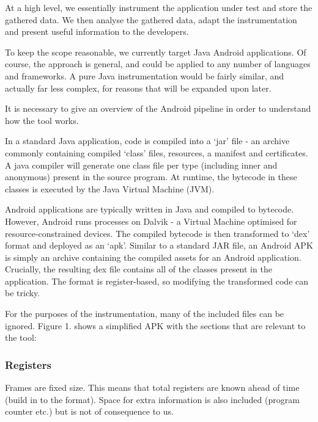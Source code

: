 
At a high level, we essentially instrument the application under test and store the gathered data. We then analyse the gathered data, adapt the instrumentation and present useful information to the developers.

To keep the scope reasonable, we currently target Java Android applications. Of course, the approach is general, and could be applied to any number of languages and frameworks. A pure Java instrumentation would be fairly similar, and actually far less complex, for reasons that will be expanded upon later.

It is necessary to give an overview of the Android pipeline in order to understand how the tool works.

In a standard Java application, code is compiled into a ‘jar’ file - an archive commonly containing compiled ‘class’ files, resources, a manifest and certificates. A java compiler will generate one class file per type (including inner and anonymous) present in the source program. At runtime, the bytecode in these classes is executed by the Java Virtual Machine (JVM).

Android applications are typically written in Java and compiled to bytecode. However, Android runs processes on Dalvik - a Virtual Machine optimised for resource-constrained devices. The compiled bytecode is then transformed to ‘dex’ format and deployed as an ‘apk’. Similar to a standard JAR file, an Android APK is simply an archive containing the compiled assets for an Android application. Crucially, the resulting dex file contains all of the classes present in the application. The format is register-based, so modifying the transformed code can be tricky.


For the purposes of the instrumentation, many of the included files can be ignored. Figure 1. shows a simplified APK with the sections that are relevant to the tool:


\subsubsection{Registers}
Frames are fixed size. This means that total registers are known ahead of time (build in to the format). Space for extra information is also included (program counter etc.) but is not of consequence to us.

